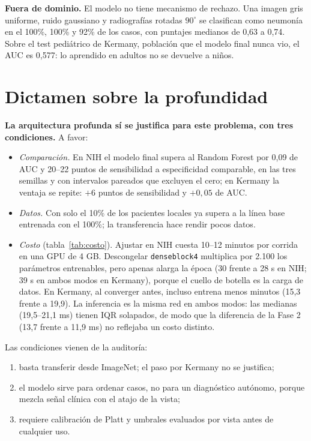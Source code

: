 \documentclass[11pt]{article}
\begin{document}
\textbf{Fuera de dominio.} El modelo no tiene mecanismo de rechazo. Una imagen gris uniforme, ruido gaussiano y radiografías rotadas $90^\circ$ se clasifican como neumonía en el 100\%, 100\% y 92\% de los casos, con puntajes medianos de 0,63 a 0,74. Sobre el test pediátrico de Kermany, población que el modelo final nunca vio, el AUC es 0,577: lo aprendido en adultos no se devuelve a niños.

\section{Dictamen sobre la profundidad}
\textbf{La arquitectura profunda sí se justifica para este problema, con tres condiciones.} A favor:
\begin{itemize}
\item \emph{Comparación.} En NIH el modelo final supera al Random Forest por 0,09 de AUC y 20--22 puntos de sensibilidad a especificidad comparable, en las tres semillas y con intervalos pareados que excluyen el cero; en Kermany la ventaja se repite: $+6$ puntos de sensibilidad y $+0{,}05$ de AUC.
\item \emph{Datos.} Con solo el 10\% de los pacientes locales ya supera a la línea base entrenada con el 100\%; la transferencia hace rendir pocos datos.
\item \emph{Costo} (tabla~\ref{tab:costo}). Ajustar en NIH cuesta 10--12 minutos por corrida en una GPU de 4 GB. Descongelar \texttt{denseblock4} multiplica por 2.100 los parámetros entrenables, pero apenas alarga la época (30 frente a 28 s en NIH; 39 s en ambos modos en Kermany), porque el cuello de botella es la carga de datos. En Kermany, al converger antes, incluso entrena menos minutos (15,3 frente a 19,9). La inferencia es la misma red en ambos modos: las medianas (19,5--21,1 ms) tienen IQR solapados, de modo que la diferencia de la Fase 2 (13,7 frente a 11,9 ms) no reflejaba un costo distinto.
\end{itemize}
Las condiciones vienen de la auditoría:
\begin{enumerate}
\item basta transferir desde ImageNet; el paso por Kermany no se justifica;
\item el modelo sirve para ordenar casos, no para un diagnóstico autónomo, porque mezcla señal clínica con el atajo de la vista;
\item requiere calibración de Platt y umbrales evaluados por vista antes de cualquier uso.
\end{enumerate}
\end{document}

